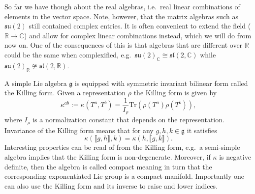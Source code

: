 \documentclass[11pt]{report}
\begin{document}
So far we have though about the real algebras, i.e.\ real linear combinations of elements in the vector space. Note, however, that the matrix algebras such as $\mathfrak{su}(2)$ still contained complex entries. It is often convenient to extend the field ($\mathbb{R}\to\mathbb{C}$) and allow for complex linear combinations instead, which we will do from now on. One of the consequences of this is that algebras that are different over $\mathbb{R}$ could be the same when complexified, e.g.\ $\mathfrak{su}(2)_\mathbb{C}\cong \mathfrak{sl}(2,\mathbb{C})$ while $\mathfrak{su}(2)_\mathbb{R}\ncong\mathfrak{sl}(2,\mathbb{\mathbb{R}})$. 

A simple Lie algebra $\mathfrak{g}$ is equipped with symmetric invariant bilinear form called the Killing form. Given a representation $\rho$ the Killing form is given by 
\begin{equation}
    \kappa^{ab} := \kappa(T^a,T^b) =  \frac{1}{I_\rho}\text{Tr}\left(\rho(T^a)\rho(T^b)\right),
\end{equation}
where $I_\rho$ is a normalization constant that depends on the representation. Invariance of the Killing form means that for any $g,h,k\in\mathfrak{g}$ it satisfies 
\begin{equation}
    \kappa(\llbracket g,h\rrbracket,k) = \kappa(h,\llbracket g,k\rrbracket). 
\end{equation}
Interesting properties can be read of from the Killing form, e.g.\ a semi-simple algebra implies that the Killing form is non-degenerate. Moreover, if $\kappa$ is negative definite, then the algebra is called compact meaning in turn that the corresponding exponentiated Lie group is a compact manifold. Importantly one can also use the Killing form and its inverse to raise and lower indices.
\end{document}
